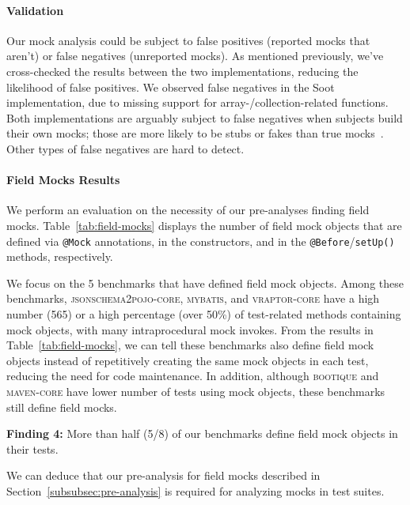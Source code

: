 \paragraph{Validation} Our mock analysis could be subject to false positives (reported mocks that aren't) or false negatives (unreported mocks). As mentioned previously, we've cross-checked the results between the two implementations, reducing the likelihood of false positives. We observed false negatives in the Soot implementation, due to missing support for array-/collection-related functions. Both implementations are arguably subject to false negatives when subjects build their own mocks; those are more likely to be stubs or fakes than true mocks~\cite{fowler07:_mocks_arent_stubs}. Other types of false negatives are hard to detect.

\paragraph{Field Mocks Results} We perform an evaluation on the necessity of our pre-analyses finding field mocks. 
Table~\ref{tab:field-mocks} displays the number of field mock objects that are defined via \texttt{@Mock} annotations, in the constructors, and in the \texttt{@Before}/\texttt{setUp()} methods, respectively. 

We focus on the 5 benchmarks that have defined field mock objects. 
Among these benchmarks, \textsc{jsonschema2pojo-core}, \textsc{mybatis}, and \textsc{vraptor-core} have a high number (565) or a high percentage (over 50\%) of test-related methods containing mock objects, with many intraprocedural mock invokes. From the results in Table~\ref{tab:field-mocks}, we can tell these benchmarks also define field mock objects instead of repetitively creating the same mock objects in each test, reducing the need for code maintenance. In addition, although \textsc{bootique} and \textsc{maven-core} have lower number of tests using mock objects, these benchmarks still define field mocks. 

\begin{mdframed}[
  leftmargin=\parindent,
  rightmargin=\parindent,
  skipabove=\topsep,
  skipbelow=\topsep
  ]
{\bf Finding 4:} More than half (5/8) of our benchmarks define field mock objects in their tests.
\end{mdframed}
We can deduce that our pre-analysis for field mocks described in Section~\ref{subsubsec:pre-analysis} is required for analyzing mocks in  test suites.

